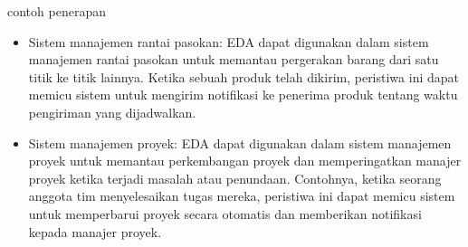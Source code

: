 \documentclass{beamer}
\begin{document}
		\begin{frame}{contoh penerapan}
		\begin{itemize}
			
			\item Sistem manajemen rantai pasokan: EDA dapat digunakan dalam sistem manajemen rantai pasokan untuk memantau pergerakan barang dari satu titik ke titik lainnya. Ketika sebuah produk telah dikirim, peristiwa ini dapat memicu sistem untuk mengirim notifikasi ke penerima produk tentang waktu pengiriman yang dijadwalkan.

			\item Sistem manajemen proyek: EDA dapat digunakan dalam sistem manajemen proyek untuk memantau perkembangan proyek dan memperingatkan manajer proyek ketika terjadi masalah atau penundaan. Contohnya, ketika seorang anggota tim menyelesaikan tugas mereka, peristiwa ini dapat memicu sistem untuk memperbarui proyek secara otomatis dan memberikan notifikasi kepada manajer proyek.
		\end{itemize}
		\end{frame}
	
\end{document}
